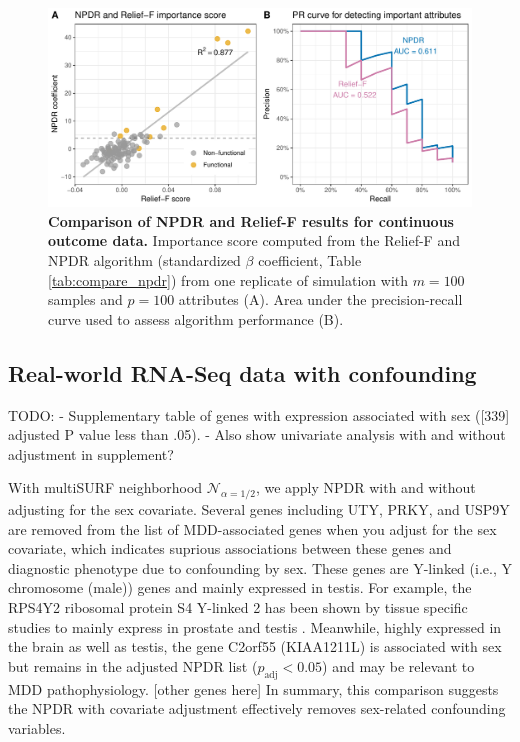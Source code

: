 \documentclass[10pt]{article}
\begin{document}
\begin{figure}[h]
\centerline{\includegraphics[]{../figs/npdr_relief_qtrait.pdf}}
\caption{{\bf Comparison of NPDR and Relief-F results for continuous outcome data.} Importance score computed from the Relief-F and NPDR algorithm (standardized $\beta$ coefficient, Table \ref{tab:compare_npdr}) from one replicate of simulation with $m = 100$ samples and $p = 100$ attributes (A). Area under the precision-recall curve used to assess algorithm performance (B).}
\label{fig:npdr_relief_qtrait}
\end{figure}

\subsection{Real-world RNA-Seq data with confounding}

TODO:
- Supplementary table of genes with expression associated with sex ([339] adjusted P value less than .05).
- Also show univariate analysis with and without adjustment in supplement? 


With multiSURF neighborhood $\mathcal{N}_{\alpha=1/2}$, we apply NPDR with and without adjusting for the sex covariate.
Several genes including UTY, PRKY, and USP9Y are removed from the list of MDD-associated genes when you adjust for the sex covariate, which indicates suprious associations between these genes and diagnostic phenotype due to confounding by sex.
These genes are Y-linked (i.e., Y chromosome (male)) genes and mainly expressed in testis.
For example, the RPS4Y2 ribosomal protein S4 Y-linked 2 has been shown by tissue specific studies to mainly express in prostate and testis \cite{lopes2010human}.
Meanwhile, highly expressed in the brain as well as testis, the gene C2orf55 (KIAA1211L) is associated with sex but remains in the adjusted NPDR list ($p_\textrm{adj} < 0.05$) and may be relevant to MDD pathophysiology.
[other genes here]
In summary, this comparison suggests the NPDR with covariate adjustment effectively removes sex-related confounding variables.
\end{document}
